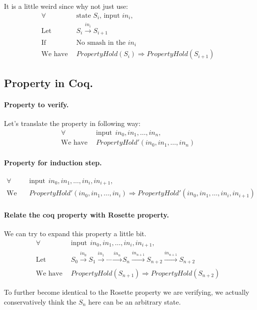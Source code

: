 \documentclass{article}
\begin{document}
It is a little weird since why not just use:
\begin{align*}
\forall &~~ \text{state $S_i$, input $in_i$}, \\
\text{Let} &~~ S_i \xrightarrow[]{in_i} S_{i+1} \\
\text{If} &~~ \text{No smash in the $in_i$} \\
\text{We have} &~~ PropertyHold(S_{i}) \Rightarrow PropertyHold(S_{i+1})
\end{align*}






\subsection{Property in Coq.}

\paragraph{Property to verify.}
Let's translate the property in following way:
\begin{align*}
\forall &~~ \text{input} ~~ in_0, in_1, \dots, in_n, \\
\text{We have} &~~ PropertyHold'(in_0, in_1, \dots, in_n)
\end{align*}




\paragraph{Property for induction step.}
\begin{align*}
\forall &~~ \text{input} ~~ in_0, in_1, \dots, in_i, in_{i+1}, \\
\text{We have} &~~ PropertyHold'(in_0, in_1, \dots, in_i) \Rightarrow PropertyHold'(in_0, in_1, \dots, in_i, in_{i+1})
\end{align*}




\paragraph{Relate the coq property with Rosette property.}
We can try to expand this property a little bit.
\begin{align*}
\forall &~~ \text{input} ~~ in_0, in_1, \dots, in_i, in_{i+1}, \\
\text{Let} &~~ S_0 \xrightarrow[]{in_0} S_{1} \xrightarrow[]{in_1} \cdots \xrightarrow[]{in_n} S_{n} \xrightarrow[]{in_{n+1}} S_{n+2} \xrightarrow[]{in_{n+1}} S_{n+2} \\
\text{We have} &~~ PropertyHold(S_{n+1}) \Rightarrow PropertyHold(S_{n+2})
\end{align*}

To further become identical to the Rosette property we are verifying, we actually conservatively think the $S_{n}$ here can be an arbitrary state.








\end{document}
